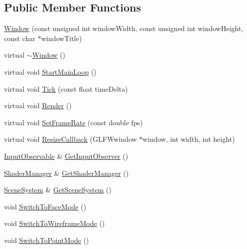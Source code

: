 \subsection*{Public Member Functions}
\begin{DoxyCompactItemize}
\item 
\mbox{\hyperlink{classec_1_1_window_af9eab51c6ea017a296866278bbbcdb28}{Window}} (const unsigned int window\+Width, const unsigned int window\+Height, const char $\ast$window\+Title)
\item 
virtual \mbox{\hyperlink{classec_1_1_window_a639d3f230ca0e232066b4c61a5a212b7}{$\sim$\+Window}} ()
\item 
virtual void \mbox{\hyperlink{classec_1_1_window_a1cde792adea9d3e15f7bab9c3100a8b9}{Start\+Main\+Loop}} ()
\item 
virtual void \mbox{\hyperlink{classec_1_1_window_aab4c6c1ee3c71e53532ec21a253cad4d}{Tick}} (const float time\+Delta)
\item 
virtual void \mbox{\hyperlink{classec_1_1_window_af0be4ef5101cfd9251511c402c1e9598}{Render}} ()
\item 
virtual void \mbox{\hyperlink{classec_1_1_window_a5fa670ea10ce548d445e1a82ded336a2}{Set\+Frame\+Rate}} (const double fps)
\item 
virtual void \mbox{\hyperlink{classec_1_1_window_a53866131854aeb378e8a21cf18c9810b}{Resize\+Callback}} (G\+L\+F\+Wwindow $\ast$window, int width, int height)
\item 
\mbox{\hyperlink{classec_1_1_input_observable}{Input\+Observable}} \& \mbox{\hyperlink{classec_1_1_window_a0f2af2fca7c4c20d027acf6afaf79b99}{Get\+Input\+Observer}} ()
\item 
\mbox{\hyperlink{classec_1_1_shader_manager}{Shader\+Manager}} \& \mbox{\hyperlink{classec_1_1_window_a5f2d20a2d7b3bc05c29830164437d190}{Get\+Shader\+Manager}} ()
\item 
\mbox{\hyperlink{classec_1_1_scene_system}{Scene\+System}} \& \mbox{\hyperlink{classec_1_1_window_aad83b5eb3bb0708c08503ac3c6b7b670}{Get\+Scene\+System}} ()
\item 
void \mbox{\hyperlink{classec_1_1_window_aefcd8fd06bb58f946100005975fc94c4}{Switch\+To\+Face\+Mode}} ()
\item 
void \mbox{\hyperlink{classec_1_1_window_a5176dd1ed33f621b4eb8f71eb64cccad}{Switch\+To\+Wireframe\+Mode}} ()
\item 
void \mbox{\hyperlink{classec_1_1_window_adaf30fde0a52c772d3b089746fd6397a}{Switch\+To\+Point\+Mode}} ()
\item 

\end{DoxyCompactItemize}
